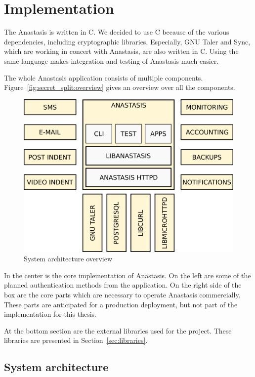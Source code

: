 \section{Implementation}

The Anastasis is written in C. We decided to use C because of the
various dependencies, including cryptographic libraries.  Especially,
GNU Taler and Sync, which are working in concert with Anastasis, are
also written in C. Using the same language makes integration and
testing of Anastasis much easier.

The whole Anastasis application consists of multiple components.
Figure~\ref{fig:secret_split:overview} gives an overview over all the
components.

\begin{figure}[H]
	\centering
		\includegraphics[scale=0.5]{images/system-architecture.png}
	\caption{System architecture overview}
	\label{fig:system_arch:overview}
\end{figure}

\noindent In the center is the core implementation of Anastasis.
On the left are some of the planned authentication methods from the
application. On the right side of the box are the core parts which are
necessary to operate Anastasis commercially. These parts are
anticipated for a production deployment, but not part of the
implementation for this thesis.

At the bottom section are the external libraries used for the project.
These libraries are presented in Section~\ref{sec:libraries}.
\newpage


\subsection{System architecture}

